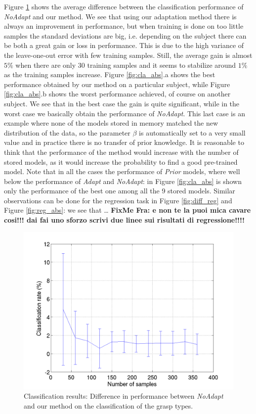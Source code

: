 Figure \ref{fig:diff_cla} shows the average difference between 
the classification performance of \emph{NoAdapt} and our method. We see that using our adaptation
method there is always an improvement in performance, but when  training is done on too little samples %
the standard deviations are big, i.e. depending on the subject there can be both a great gain or loss in performance. 
This is due to the high variance of the
leave-one-out error with few training samples. Still, the average gain is
almost $5\%$ when there are only 30 training samples and it seems to stabilize
around $1\%$ as the training samples increase.
Figure \ref{fig:cla_abs}.a shows the best performance obtained by our method
on a particular subject, while  Figure \ref{fig:cla_abs}.b shows the worst
performance achieved, of course on another subject. We see that in the best case the gain is quite significant,
while in the worst case we basically obtain  the performance of \emph{NoAdapt}. This last case is an example
where none of the models stored in memory matched the new distribution of the data, so the parameter
$\beta$ is automatically set to a very small value and in practice there is no transfer of prior knowledge. It is reasonable to think
that the performance of the method would increase with the number of stored
models, as it would increase the probability to find a good pre-trained model.
Note that in all the cases the performance of \emph{Prior} models, where well
below the performance of \emph{Adapt} and \emph{NoAdapt}: in Figure \ref{fig:cla_abs} is shown
only the performance of the best one among all the 9 stored models.
Similar observations can be done for the regression task in Figure \ref{fig:diff_reg}
and Figure \ref{fig:reg_abs}: we see that \ldots
{\bf FixMe Fra: e non te la puoi mica cavare cosi!!! dai fai uno sforzo scrivi due linee sui risultati di regressione!!!!}

\begin{figure}[t]
  \centering
  \includegraphics[width=0.95\linewidth]{figs/exp1}
  \caption{Classification results: Difference in performance between \emph{NoAdapt} and our method  on the
 classification of the grasp types.}
  \label{fig:diff_cla}
\end{figure}

